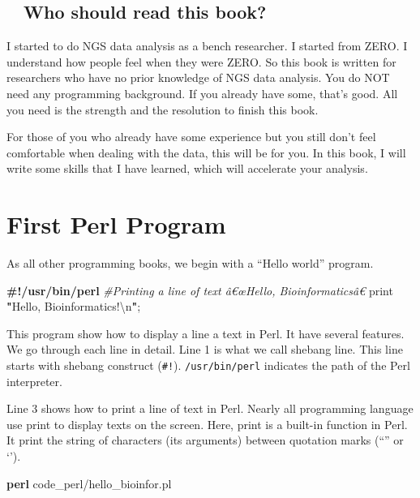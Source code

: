 \documentclass[]{book}
\newenvironment{Shaded}{\begin{snugshade}}{\end{snugshade}}
\newcommand{\KeywordTok}[1]{\textcolor[rgb]{0.13,0.29,0.53}{\textbf{{#1}}}}
\newcommand{\CharTok}[1]{\textcolor[rgb]{0.31,0.60,0.02}{{#1}}}
\newcommand{\StringTok}[1]{\textcolor[rgb]{0.31,0.60,0.02}{{#1}}}
\newcommand{\CommentTok}[1]{\textcolor[rgb]{0.56,0.35,0.01}{\textit{{#1}}}}
\newcommand{\FunctionTok}[1]{\textcolor[rgb]{0.00,0.00,0.00}{{#1}}}
\newcommand{\NormalTok}[1]{{#1}}
\begin{document}
\section{　Who should read this book?}\label{who-should-read-this-book}

I started to do NGS data analysis as a bench researcher. I started from
ZERO. I understand how people feel when they were ZERO. So this book is
written for researchers who have no prior knowledge of NGS data
analysis. You do NOT need any programming background. If you already
have some, that's good. All you need is the strength and the resolution
to finish this book.

For those of you who already have some experience but you still don't
feel comfortable when dealing with the data, this will be for you. In
this book, I will write some skills that I have learned, which will
accelerate your analysis.

\chapter{First Perl Program}\label{first-perl-program}

As all other programming books, we begin with a ``Hello world'' program.

\begin{Shaded}
\begin{Highlighting}[]
\KeywordTok{#!/usr/bin/perl}
\CommentTok{#Printing a line of text â€œHello, Bioinformaticsâ€}
\FunctionTok{print} \KeywordTok{"}\StringTok{Hello, Bioinformatics!}\CharTok{\textbackslash{}n}\KeywordTok{"}\NormalTok{;}
\end{Highlighting}
\end{Shaded}

This program show how to display a line a text in Perl. It have several
features. We go through each line in detail. Line 1 is what we call
shebang line. This line starts with shebang construct (\texttt{\#!}).
\texttt{/usr/bin/perl} indicates the path of the Perl interpreter.

Line 3 shows how to print a line of text in Perl. Nearly all programming
language use print to display texts on the screen. Here, print is a
built-in function in Perl. It print the string of characters (its
arguments) between quotation marks (``'' or `').

\begin{Shaded}
\begin{Highlighting}[]
\KeywordTok{perl} \NormalTok{code_perl/hello_bioinfor.pl}
\end{Highlighting}
\end{Shaded}
\end{document}
